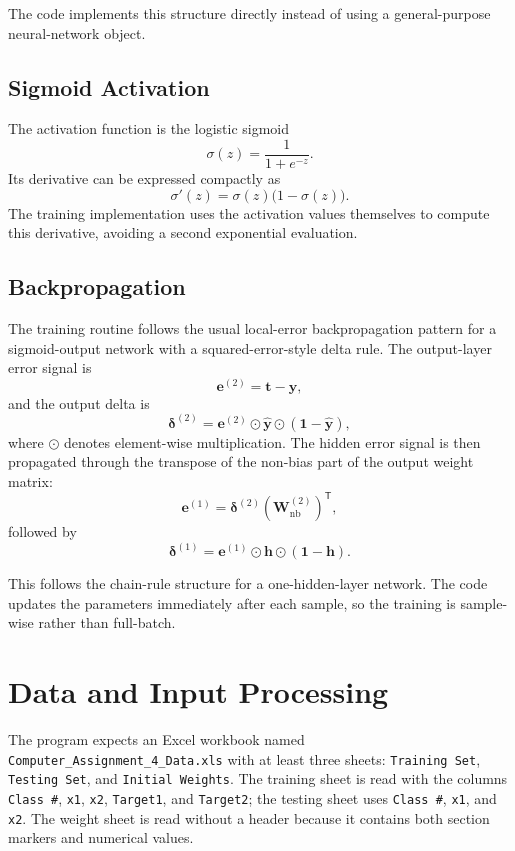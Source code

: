 \documentclass[11pt,a4paper]{article}
\newcommand{\code}[1]{\texttt{\small #1}}
\begin{document}
The code implements this structure directly instead of using a general-purpose neural-network object.

\subsection{Sigmoid Activation}
The activation function is the logistic sigmoid
\begin{equation}
\sigma(z)=\frac{1}{1+e^{-z}}.
\end{equation}
Its derivative can be expressed compactly as
\begin{equation}
\sigma'(z)=\sigma(z)\bigl(1-\sigma(z)\bigr).
\end{equation}
The training implementation uses the activation values themselves to compute this derivative, avoiding a second exponential evaluation.

\subsection{Backpropagation}
The training routine follows the usual local-error backpropagation pattern for a sigmoid-output network with a squared-error-style delta rule. The output-layer error signal is
\begin{equation}
\mathbf{e}^{(2)}=\mathbf{t}-\hat{\mathbf{y}},
\end{equation}
and the output delta is
\begin{equation}
\boldsymbol{\delta}^{(2)}
=\mathbf{e}^{(2)}\odot\hat{\mathbf{y}}\odot(\mathbf{1}-\hat{\mathbf{y}}),
\end{equation}
where \(\odot\) denotes element-wise multiplication. The hidden error signal is then propagated through the transpose of the non-bias part of the output weight matrix:
\begin{equation}
\mathbf{e}^{(1)}=\boldsymbol{\delta}^{(2)}\left(\mathbf{W}^{(2)}_{\mathrm{nb}}\right)^{\mathsf T},
\end{equation}
followed by
\begin{equation}
\boldsymbol{\delta}^{(1)}
=\mathbf{e}^{(1)}\odot\mathbf{h}\odot(\mathbf{1}-\mathbf{h}).
\end{equation}

This follows the chain-rule structure for a one-hidden-layer network. The code updates the parameters immediately after each sample, so the training is sample-wise rather than full-batch.

\section{Data and Input Processing}
The program expects an Excel workbook named \code{Computer\_Assignment\_4\_Data.xls} with at least three sheets: \code{Training Set}, \code{Testing Set}, and \code{Initial Weights}. The training sheet is read with the columns \code{Class \#}, \code{x1}, \code{x2}, \code{Target1}, and \code{Target2}; the testing sheet uses \code{Class \#}, \code{x1}, and \code{x2}. The weight sheet is read without a header because it contains both section markers and numerical values.
\end{document}
